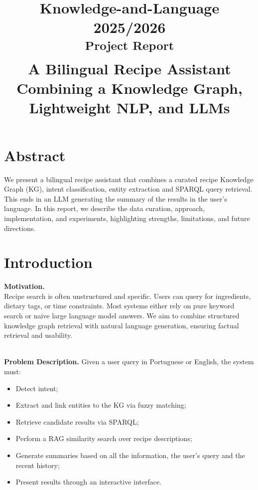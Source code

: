 \documentclass[conference]{IEEEtran}
\begin{document}
\title{Knowledge-and-Language 2025/2026 \\
{\textsuperscript{Project Report}}\\
A Bilingual Recipe Assistant Combining a Knowledge Graph, Lightweight NLP, and LLMs
}

\author{
\and
{}
}

\maketitle

\section{Abstract}
\noindent
We present a bilingual recipe assistant that combines a curated recipe Knowledge Graph (KG), intent classification, entity extraction and SPARQL query retrieval.
This ends in an LLM generating the summary of the results in the user's language. In this report, we describe the data curation, approach, implementation, and experiments, highlighting strengths, limitations, and future directions.

\section{Introduction}

\noindent
\textbf{Motivation.}
\\
Recipe search is often unstructured and specific. Users can query for ingredients, dietary tags, or time constraints. Most systems either rely on pure keyword search or naive large language model answers. We aim to combine structured knowledge graph retrieval with natural language generation, ensuring factual retrieval and  usability.

\noindent
\\
\textbf{Problem Description.}
Given a user query in Portuguese or English, the system must:
\begin{itemize}
  \item Detect intent;
  \item Extract and link entities to the KG via fuzzy matching;
  \item Retrieve candidate results via SPARQL;
  \item Perform a RAG similarity search over recipe descriptions;   
  \item Generate summaries based on all the information, the user's query and the recent history;
  \item Present results through an interactive interface.
\end{itemize}
\end{document}
